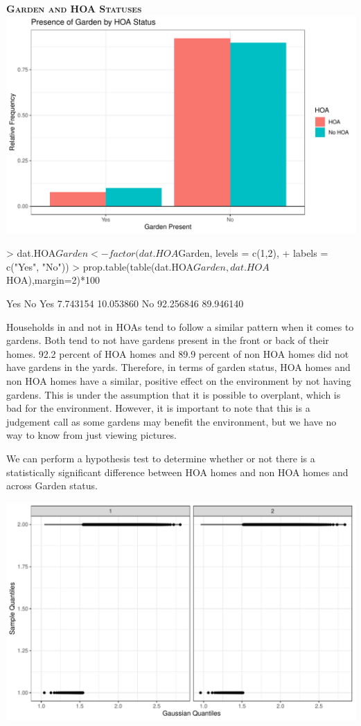 \documentclass{article}
\begin{document}
\newpage
\textsc{\textbf{Garden and HOA Statuses}}
\newline
\newline
\includegraphics{part2-024}

\begin{Schunk}
\begin{Sinput}
> dat.HOA$Garden<-factor(dat.HOA$Garden, levels = c(1,2),
+                         labels = c("Yes", "No"))
> prop.table(table(dat.HOA$Garden, dat.HOA$HOA),margin=2)*100
\end{Sinput}
\begin{Soutput}
            Yes        No
  Yes  7.743154 10.053860
  No  92.256846 89.946140
\end{Soutput}
\end{Schunk}

Households in and not in HOAs tend to follow a similar pattern when it comes to gardens. Both tend to not have gardens present in the front or back of their homes. 92.2 percent of HOA homes and 89.9 percent of non HOA homes did not have gardens in the yards. Therefore, in terms of garden status, HOA homes and non HOA homes have a similar, positive effect on the environment by not having gardens. This is under the assumption that it is possible to overplant, which is bad for the environment. However, it is important to note that this is a judgement call as some gardens may benefit the environment, but we have no way to know from just viewing pictures.

We can perform a hypothesis test to determine whether or not there is a statistically significant difference between HOA homes and non HOA homes and across Garden status. 

\includegraphics{part2-026}
\end{document}
